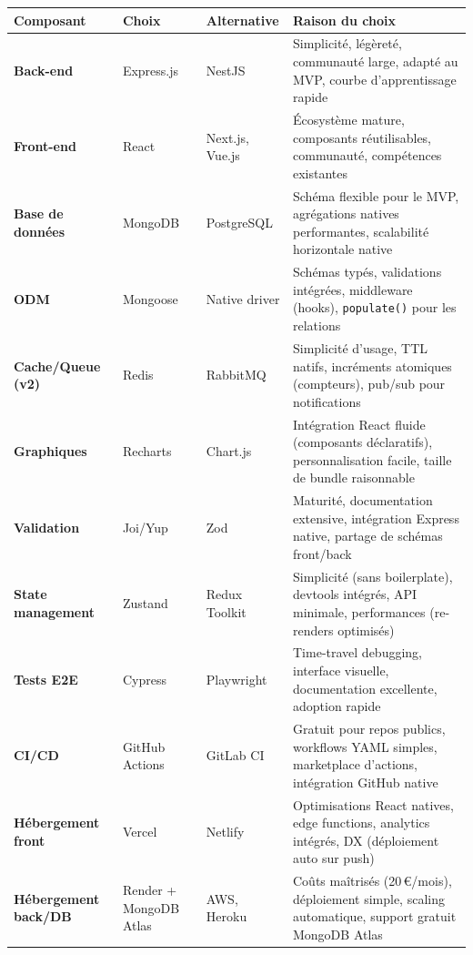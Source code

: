 \begin{center}
\scriptsize
\begin{tabular}{|p{2.5cm}|p{2.5cm}|p{3cm}|p{5.5cm}|}
\hline
\textbf{Composant} & \textbf{Choix} & \textbf{Alternative} & \textbf{Raison du choix} \\
\hline
\textbf{Back-end} & Express.js & NestJS & Simplicité, légèreté, communauté large, adapté au MVP, courbe d'apprentissage rapide \\
\hline
\textbf{Front-end} & React & Next.js, Vue.js & Écosystème mature, composants réutilisables, communauté, compétences existantes \\
\hline
\textbf{Base de données} & MongoDB & PostgreSQL & Schéma flexible pour le MVP, agrégations natives performantes, scalabilité horizontale native \\
\hline
\textbf{ODM} & Mongoose & Native driver & Schémas typés, validations intégrées, middleware (hooks), \texttt{populate()} pour les relations \\
\hline
\textbf{Cache/Queue (v2)} & Redis & RabbitMQ & Simplicité d'usage, TTL natifs, incréments atomiques (compteurs), pub/sub pour notifications \\
\hline
\textbf{Graphiques} & Recharts & Chart.js & Intégration React fluide (composants déclaratifs), personnalisation facile, taille de bundle raisonnable \\
\hline
\textbf{Validation} & Joi/Yup & Zod & Maturité, documentation extensive, intégration Express native, partage de schémas front/back \\
\hline
\textbf{State management} & Zustand & Redux Toolkit & Simplicité (sans boilerplate), devtools intégrés, API minimale, performances (re-renders optimisés) \\
\hline
\textbf{Tests E2E} & Cypress & Playwright & Time-travel debugging, interface visuelle, documentation excellente, adoption rapide \\
\hline
\textbf{CI/CD} & GitHub Actions & GitLab CI & Gratuit pour repos publics, workflows YAML simples, marketplace d'actions, intégration GitHub native \\
\hline
\textbf{Hébergement front} & Vercel & Netlify & Optimisations React natives, edge functions, analytics intégrés, DX (déploiement auto sur push) \\
\hline
\textbf{Hébergement back/DB} & Render + MongoDB Atlas & AWS, Heroku & Coûts maîtrisés (20\,€/mois), déploiement simple, scaling automatique, support gratuit MongoDB Atlas \\
\hline
\end{tabular}
\end{center}


